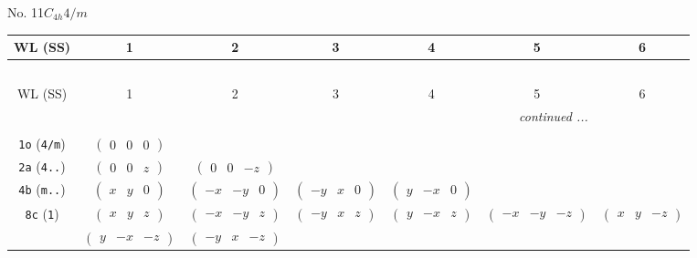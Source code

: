 \documentclass[fleqn,9pt,landscape]{jsarticle}
\begin{document}
\newpage
No. 11\quad$C_{4h}$\quad$4/m$\quad[ tetragonal ]
\begin{center}
\renewcommand{\arraystretch}{1.2}
\begin{longtable}{ccccccc}
 \hline \hline
WL (SS) & 1 & 2 & 3 & 4 & 5 & 6 \\ \hline \endfirsthead

\multicolumn{6}{l}{\tablename\ \thetable{}} \\
 \hline \hline
WL (SS) & 1 & 2 & 3 & 4 & 5 & 6 \\ \hline \endhead

 \hline \hline
\multicolumn{6}{r}{\footnotesize\it continued ...} \\ \endfoot

 \hline \hline
\multicolumn{6}{r}{} \\ \endlastfoot

{\tt 1o} ({\tt 4/m}) & $ \begin{pmatrix} 0 & 0 & 0 \end{pmatrix} $ & $  $ & $  $ & $  $ & $  $ & $  $ \\ \hline
{\tt 2a} ({\tt 4..}) & $ \begin{pmatrix} 0 & 0 & z \end{pmatrix} $ & $ \begin{pmatrix} 0 & 0 & - z \end{pmatrix} $ & $  $ & $  $ & $  $ & $  $ \\ \hline
{\tt 4b} ({\tt m..}) & $ \begin{pmatrix} x & y & 0 \end{pmatrix} $ & $ \begin{pmatrix} - x & - y & 0 \end{pmatrix} $ & $ \begin{pmatrix} - y & x & 0 \end{pmatrix} $ & $ \begin{pmatrix} y & - x & 0 \end{pmatrix} $ & $  $ & $  $ \\ \hline
{\tt 8c} ({\tt 1}) & $ \begin{pmatrix} x & y & z \end{pmatrix} $ & $ \begin{pmatrix} - x & - y & z \end{pmatrix} $ & $ \begin{pmatrix} - y & x & z \end{pmatrix} $ & $ \begin{pmatrix} y & - x & z \end{pmatrix} $ & $ \begin{pmatrix} - x & - y & - z \end{pmatrix} $ & $ \begin{pmatrix} x & y & - z \end{pmatrix} $ \\
& $ \begin{pmatrix} y & - x & - z \end{pmatrix} $ & $ \begin{pmatrix} - y & x & - z \end{pmatrix} $ & $  $ & $  $ & $  $ & $  $ \\
\end{longtable}
\end{center}
\end{document}
